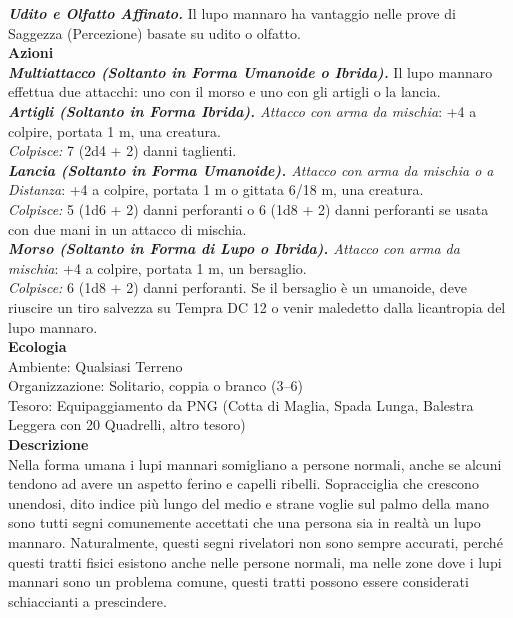 \begin{multicols}{2}
\emph{\textbf{Udito e Olfatto Affinato.}} Il lupo mannaro ha vantaggio nelle prove di Saggezza (Percezione) basate su udito o olfatto.\\
\smallskip\textbf{Azioni}\\

\emph{\textbf{Multiattacco (Soltanto in Forma Umanoide o Ibrida).}} Il lupo mannaro effettua due attacchi: uno con il morso e uno con gli artigli o la lancia.\\
\emph{\textbf{Artigli (Soltanto in Forma Ibrida).} Attacco con arma da mischia}: +4 a colpire, portata 1 m, una creatura.\\
\emph{Colpisce:} 7 (2d4 + 2) danni taglienti.\\

\emph{\textbf{Lancia (Soltanto in Forma Umanoide).} Attacco con arma da mischia o a Distanza}: +4 a colpire, portata 1 m o gittata 6/18 m, una creatura.\\

\emph{Colpisce:} 5 (1d6 + 2) danni perforanti o 6 (1d8 + 2) danni perforanti se usata con due mani in un attacco di mischia.\\

\emph{\textbf{Morso (Soltanto in Forma di Lupo o Ibrida).} Attacco con arma da mischia}: +4 a colpire, portata 1 m, un bersaglio.\\
\emph{Colpisce:} 6 (1d8 + 2) danni perforanti. Se il bersaglio è un umanoide, deve riuscire un tiro salvezza su Tempra DC 12 o venir maledetto dalla licantropia del lupo mannaro.\\
\textbf{Ecologia}\\
Ambiente: Qualsiasi Terreno\\
Organizzazione: Solitario, coppia o branco (3–6)\\
Tesoro: Equipaggiamento da PNG (Cotta di Maglia, Spada Lunga, Balestra Leggera con 20 Quadrelli, altro tesoro)\\
\textbf{Descrizione}\\
Nella forma umana i lupi mannari somigliano a persone normali, anche se alcuni tendono ad avere un aspetto ferino e capelli ribelli. Sopracciglia che crescono unendosi, dito indice più lungo del medio e strane voglie sul palmo della mano sono tutti segni comunemente accettati che una persona sia in realtà un lupo mannaro. Naturalmente, questi segni rivelatori non sono sempre accurati, perché questi tratti fisici esistono anche nelle persone normali, ma nelle zone dove i lupi mannari sono un problema comune, questi tratti possono essere considerati schiaccianti a prescindere.\\


\end{multicols}
